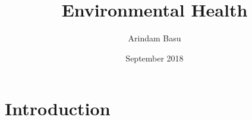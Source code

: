 \documentclass{article}
\title{Environmental Health}
\author{Arindam Basu}
\date{September 2018}
\begin{document}
\maketitle

\section*{Introduction}
\end{document}
